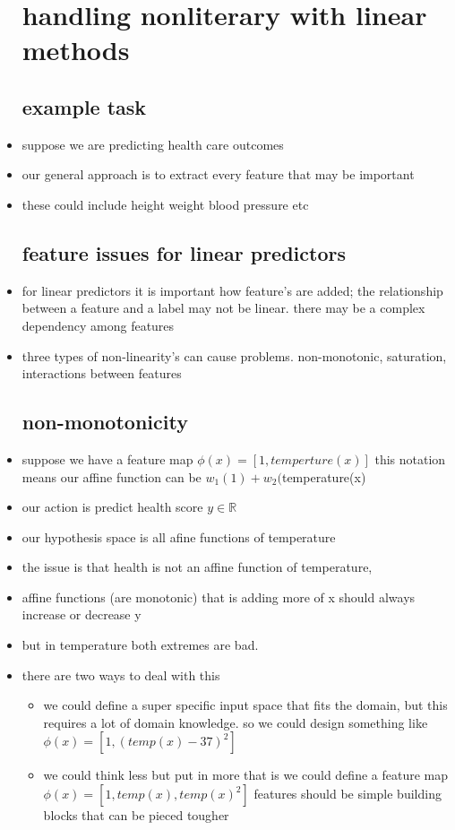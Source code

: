 \documentclass{article}
\begin{document}
\begin{itemize}
\section{handling nonliterary with linear methods}
\subsection{example task}
\item suppose we are predicting health care outcomes 
\item our general approach is to extract every feature that may be important 
\item these could include height weight blood pressure etc
\subsection{feature issues for linear predictors}
\item for linear predictors it is important how feature's are added; the relationship between a feature and a label may not be linear. there may be a complex dependency among features 
\item three types of non-linearity's can cause problems. non-monotonic, saturation, interactions between features 
\subsection{non-monotonicity}
\item suppose we have a feature map $\phi(x)=[1, temperture(x)]$ this notation means our affine function can be $w_1(1)+w_2($temperature(x)
\item our action is predict health score $y\in \mathbb{R}$
\item our hypothesis space is all afine functions of temperature 
\item the issue is that health is not an affine function of temperature, 
\item affine functions (are monotonic) that is adding more of x should always increase or decrease y
\item but in temperature both extremes are bad. 
\item there are two ways to deal with this 
\begin{itemize}
    \item we could define a super specific input space that fits the domain, but this  requires a lot of domain knowledge. so we could design something like $\phi(x)=[1, (temp(x)-37)^2]$
    \item we could think less but put in more that is we could define a feature map $\phi(x)=[1,temp(x),temp(x)^2]$ features should be simple building blocks that can be pieced tougher
\end{itemize}

\end{itemize}
\end{document}
